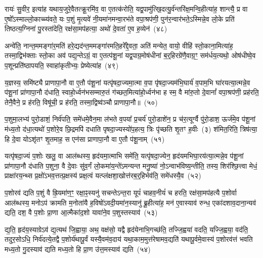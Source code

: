 रायः॑ सु॒वीर॒ इत्या॑ह यथाय॒जुरे॒वैतत्क्रू॒रमि॑व॒ वा ए॒तत्क॑रोति॒ यद्व॒पामु॑त्खि॒दत्यु॒र्व॑न्तरि॑क्ष॒मन्वि॒हीत्या॑ह॒ शान्त्यै॒ प्र वा ए॒षो᳚\-ऽस्माल्लो॒काच्च्य॑वते॒ यः प॒शुं मृ॒त्यवे॑ नी॒यमा॑नमन्वा॒रभ॑ते वपा॒श्रप॑णी॒ पुन॑र॒न्वार॑भते॒\-ऽस्मिन्ने॒व लो॒के प्रति॑ तिष्ठत्य॒ग्निना॑ पु॒रस्ता॑देति॒ रक्ष॑सा॒मप॑हत्या॒ अथो॑ दे॒वता॑ ए॒व ह॒व्येन॑~(४८)

अन्वे॑ति॒ नान्त॒ममङ्गा॑र॒मति॑ हरे॒द्यद॑न्त॒ममङ्गा॑रमति॒हरे᳚द्दे॒वता॒ अति॑ मन्येत॒ वायो॒ वीहि॑ स्तो॒काना॒मित्या॑ह॒ तस्मा॒द्विभ॑क्ताः स्तो॒का अव॑ पद्य॒न्ते\-ऽग्रं॒ वा ए॒तत्प॑शू॒नां यद्व॒पाग्र॒मोष॑धीनां ब॒र्॒\mbox{}हिरग्रे॑णै॒वाग्र॒ꣳ॒ सम॑र्धय॒त्यथो॒ ओष॑धीष्वे॒व प॒शून्प्रति॑\-ष्ठापयति॒ स्वाहा॑कृतीभ्यः॒ प्रेष्येत्या॑ह~(४९)

य॒ज्ञस्य॒ समि॑ष्ट्यै प्राणापा॒नौ वा ए॒तौ प॑शू॒नां यत्पृ॑षदा॒ज्यमा॒त्मा व॒पा पृ॑षदा॒ज्यम॑भि॒घार्य॑ व॒पाम॒भि घा॑रयत्या॒त्मन्ने॒व प॑शू॒नां प्रा॑णापा॒नौ द॑धाति॒ स्वाहो॒र्ध्वन॑भसम्मारु॒तं ग॑च्छत॒मित्या॑हो॒र्ध्वन॑भा ह स्म॒ वै मा॑रु॒तो दे॒वानां᳚ वपा॒श्रप॑णी॒ प्रह॑रति॒ तेनै॒वैने॒ प्र ह॑रति॒ विषू॑ची॒ प्र ह॑रति॒ तस्मा॒द्विष्व॑ञ्चौ प्राणापा॒नौ॥~(५०)

{\anuvakamend[{स्वधि॑तिश्चै॒वाच्छि॑न्नो ह॒व्येने॒ष्येत्या॑ह॒ षट्च॑त्वारिꣳशच्च}]}%

प॒शुमा॒लभ्य॑ पुरो॒डाशं॒ निर्व॑पति॒ समे॑धमे॒वैन॒मा ल॑भते व॒पया᳚ प्र॒चर्य॑ पुरो॒डाशे॑न॒ प्र च॑र॒त्यूर्ग्वै पु॑रो॒डाश॒ ऊर्ज॑मे॒व प॑शू॒नां म॑ध्य॒तो द॑धा॒त्यथो॑ प॒शोरे॒व छि॒द्रमपि॑ दधाति पृषदा॒ज्यस्यो॑प॒हत्य॒ त्रिः पृ॑च्छति शृ॒तꣳ ह॒वीः~(३) श॑मित॒रिति॒ त्रिष॑त्या॒ हि दे॒वा यो\-ऽशृ॑तꣳ शृ॒तमाह॒ स एन॑सा प्राणापा॒नौ वा ए॒तौ प॑शू॒नाम्~(५१)

यत्पृ॑षदा॒ज्यं प॒शोः खलु॒ वा आल॑ब्धस्य॒ हृद॑यमा॒त्माभि समे॑ति॒ यत्पृ॑षदा॒ज्येन॒ हृद॑यमभिघा॒रय॑त्या॒त्मन्ने॒व प॑शू॒नां प्रा॑णापा॒नौ द॑धाति प॒शुना॒ वै दे॒वाः सु॑व॒र्गं लो॒कमा॑य॒न्ते॑\-ऽमन्यन्त मनु॒ष्या॑ नो॒\-ऽन्वाभ॑विष्य॒न्तीति॒ तस्य॒ शिर॑श्छि॒त्त्वा मेधं॒ प्राक्षा॑रय॒न्थ्स प्र॒क्षो॑\-ऽभव॒त्तत्प्र॒क्षस्य॑ प्रक्ष॒त्वं यत्प्ल॑क्षशा॒खोत्त॑रब॒र्॒\mbox{}हिर्भव॑ति॒ समे॑धस्यै॒व~(५२)

प॒शोरव॑ द्यति प॒शुं वै ह्रि॒यमा॑ण॒ꣳ॒ रक्षा॒ꣴ॒स्यनु॑ सचन्ते\-ऽन्त॒रा यूपं॑ चाहव॒नीयं॑ च हरति॒ रक्ष॑सा॒मप॑हत्यै प॒शोर्वा आल॑ब्धस्य॒ मनो\-ऽप॑ क्रामति म॒नोता॑यै ह॒विषो॑\-ऽवदी॒यमा॑न॒स्यानु॑ ब्रू॒हीत्या॑ह॒ मन॑ ए॒वास्याव॑ रुन्ध॒ एका॑\-दशाव॒दाना॒न्यव॑ द्यति॒ दश॒ वै प॒शोः प्रा॒णा आ॒त्मैका॑द॒शो यावा॑ने॒व प॒शुस्तस्याव॑~(५३)

द्य॒ति॒ हृद॑य॒स्याग्रे\-ऽव॑ द्य॒त्यथ॑ जि॒ह्वाया॒ अथ॒ वक्ष॑सो॒ यद्वै हृद॑येनाभि॒गच्छ॑ति॒ तज्जि॒ह्वया॑ वदति॒ यज्जि॒ह्वया॒ वद॑ति॒ तदुर॒सो\-ऽधि॒ निर्व॑दत्ये॒तद्वै प॒शोर्य॑थापू॒र्वं यस्यै॒वम॑व॒दाय॑ यथा॒काम॒मुत्त॑रेषामव॒द्यति॑ यथापू॒र्वमे॒वास्य॑ प॒शोरव॑त्तं भवति मध्य॒तो गु॒दस्याव॑ द्यति मध्य॒तो हि प्रा॒ण उ॑त्त॒मस्याव॑ द्यति~(५४)

